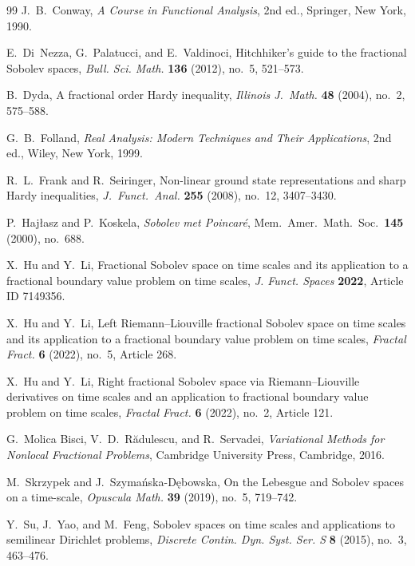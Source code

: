 \documentclass[11pt,a4paper]{article}
\numberwithin{equation}{section}
\theoremstyle{definition}
\begin{document}
\begin{thebibliography}{99}
J.~B.~Conway,
\emph{A Course in Functional Analysis},
2nd ed., Springer, New York, 1990.

E.~Di~Nezza, G.~Palatucci, and E.~Valdinoci,
Hitchhiker's guide to the fractional Sobolev spaces,
\emph{Bull. Sci. Math.} \textbf{136} (2012), no.~5, 521--573.

B.~Dyda,
A fractional order Hardy inequality,
\textit{Illinois J.\ Math.} \textbf{48} (2004), 
no.~2, 575--588.

G.~B.~Folland,
\emph{Real Analysis: Modern Techniques and Their Applications},
2nd ed., Wiley, New York, 1999.

R.~L.~Frank and R.~Seiringer,
Non-linear ground state representations and sharp 
Hardy inequalities,
\textit{J.\ Funct.\ Anal.} \textbf{255} (2008), 
no.~12, 3407--3430.

P.~Haj{\l}asz and P.~Koskela,
\textit{Sobolev met Poincar\'e},
Mem.\ Amer.\ Math.\ Soc.\ \textbf{145} (2000), no.~688.

X.~Hu and Y.~Li,
Fractional Sobolev space on time scales and its application to a fractional boundary value problem on time scales,
\emph{J. Funct. Spaces} \textbf{2022}, Article ID 7149356.

X.~Hu and Y.~Li,
Left Riemann--Liouville fractional Sobolev space on time scales and its application to a fractional boundary value problem on time scales,
\emph{Fractal Fract.} \textbf{6} (2022), no.~5, Article 268.

X.~Hu and Y.~Li,
Right fractional Sobolev space via Riemann--Liouville derivatives on time scales and an application to fractional boundary value problem on time scales,
\emph{Fractal Fract.} \textbf{6} (2022), no.~2, Article 121.

G.~Molica Bisci, V.~D.~R\u{a}dulescu, and R.~Servadei,
\emph{Variational Methods for Nonlocal Fractional Problems},
Cambridge University Press, Cambridge, 2016.

M.~Skrzypek and J.~Szyma\'nska-D\k{e}bowska,
On the Lebesgue and Sobolev spaces on a time-scale,
\emph{Opuscula Math.} \textbf{39} (2019), no.~5, 719--742.

Y.~Su, J.~Yao, and M.~Feng,
Sobolev spaces on time scales and applications to semilinear Dirichlet problems,
\emph{Discrete Contin. Dyn. Syst. Ser. S} \textbf{8} (2015), no.~3, 463--476.


\end{thebibliography}
\end{document}
